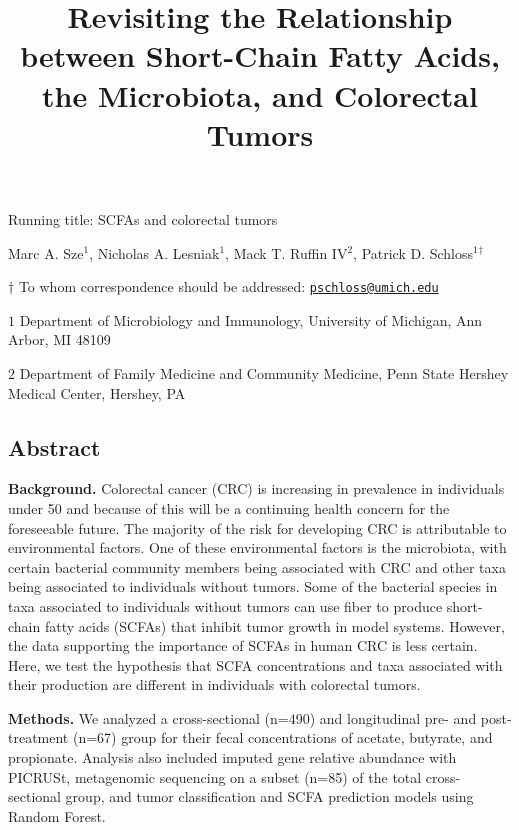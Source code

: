\documentclass[11pt,]{article}
\title{Revisiting the Relationship between Short-Chain Fatty Acids, the
Microbiota, and Colorectal Tumors}
\author{}
\date{}
\begin{document}
\maketitle

\vspace{35mm}

Running title: SCFAs and colorectal tumors

\vspace{35mm}

Marc A. Sze\({^1}\), Nicholas A. Lesniak\({^1}\), Mack T. Ruffin
IV\({^2}\), Patrick D. Schloss\({^1}\)\({^\dagger}\)

\vspace{40mm}

\(\dagger\) To whom correspondence should be addressed:
\href{mailto:pschloss@umich.edu}{\nolinkurl{pschloss@umich.edu}}

\(1\) Department of Microbiology and Immunology, University of Michigan,
Ann Arbor, MI 48109

\(2\) Department of Family Medicine and Community Medicine, Penn State
Hershey Medical Center, Hershey, PA

\newpage

\linenumbers

\subsection{Abstract}\label{abstract}

\textbf{Background.} Colorectal cancer (CRC) is increasing in prevalence
in individuals under 50 and because of this will be a continuing health
concern for the foreseeable future. The majority of the risk for
developing CRC is attributable to environmental factors. One of these
environmental factors is the microbiota, with certain bacterial
community members being associated with CRC and other taxa being
associated to individuals without tumors. Some of the bacterial species
in taxa associated to individuals without tumors can use fiber to
produce short-chain fatty acids (SCFAs) that inhibit tumor growth in
model systems. However, the data supporting the importance of SCFAs in
human CRC is less certain. Here, we test the hypothesis that SCFA
concentrations and taxa associated with their production are different
in individuals with colorectal tumors.

\textbf{Methods.} We analyzed a cross-sectional (n=490) and longitudinal
pre- and post-treatment (n=67) group for their fecal concentrations of
acetate, butyrate, and propionate. Analysis also included imputed gene
relative abundance with PICRUSt, metagenomic sequencing on a subset
(n=85) of the total cross-sectional group, and tumor classification and
SCFA prediction models using Random Forest.
\end{document}
